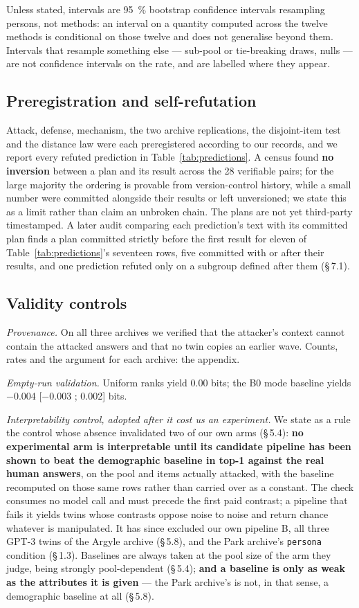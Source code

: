 \documentclass[sigconf,anonymous,review]{acmart}
\begin{document}
Unless stated, intervals are 95~\% bootstrap confidence intervals resampling persons, not methods: an interval on a quantity computed across the twelve methods is conditional on those twelve and does not generalise beyond them. Intervals that resample something else --- sub-pool or tie-breaking draws, nulls --- are not confidence intervals on the rate, and are labelled where they appear.

\subsection{Preregistration and self-refutation}

Attack, defense, mechanism, the two archive replications, the disjoint-item test and the distance law were each preregistered according to our records, and we report every refuted prediction in Table~\ref{tab:predictions}. A census found \textbf{no inversion} between a plan and its result across the 28 verifiable pairs; for the large majority the ordering is provable from version-control history, while a small number were committed alongside their results or left unversioned; we state this as a limit rather than claim an unbroken chain. The plans are not yet third-party timestamped. A later audit comparing each prediction's text with its committed plan finds a plan committed strictly before the first result for eleven of Table~\ref{tab:predictions}'s seventeen rows, five committed with or after their results, and one prediction refuted only on a subgroup defined after them (\S\,7.1).

\subsection{Validity controls}

\textit{Provenance.} On all three archives we verified that the attacker's context cannot contain the attacked answers and that no twin copies an earlier wave. Counts, rates and the argument for each archive: the appendix.

\textit{Empty-run validation.} Uniform ranks yield 0.00 bits; the B0 mode baseline yields $-0$.004 [$-0$.003 ; 0.002] bits.

\textit{Interpretability control, adopted after it cost us an experiment.} We state as a rule the control whose absence invalidated two of our own arms (\S\,5.4): \textbf{no experimental arm is interpretable until its candidate pipeline has been shown to beat the demographic baseline in top-1 against the real human answers}, on the pool and items actually attacked, with the baseline recomputed on those same rows rather than carried over as a constant. The check consumes no model call and must precede the first paid contrast; a pipeline that fails it yields twins whose contrasts oppose noise to noise and return chance whatever is manipulated. It has since excluded our own pipeline B, all three GPT-3 twins of the Argyle archive (\S\,5.8), and the Park archive's \texttt{persona} condition (\S\,1.3). Baselines are always taken at the pool size of the arm they judge, being strongly pool-dependent (\S\,5.4); \textbf{and a baseline is only as weak as the attributes it is given} --- the Park archive's is not, in that sense, a demographic baseline at all (\S\,5.8).
\end{document}
